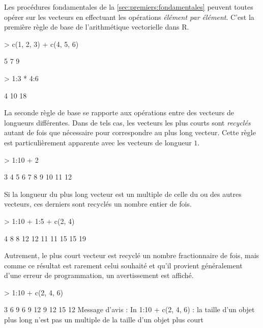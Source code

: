 Les procédures fondamentales de la \autoref{sec:premiers:fondamentales}
peuvent toutes opérer sur les vecteurs en effectuant les opérations
\emph{élément par élément}. C'est la première règle de base de
l'arithmétique vectorielle dans R.
\begin{Schunk}
\begin{Sinput}
> c(1, 2, 3) + c(4, 5, 6)
\end{Sinput}
\begin{Soutput}
[1] 5 7 9
\end{Soutput}
\begin{Sinput}
> 1:3 * 4:6
\end{Sinput}
\begin{Soutput}
[1]  4 10 18
\end{Soutput}
\end{Schunk}

La seconde règle de base se rapporte aux opérations entre des vecteurs
de longueurs différentes. Dans de tels cas, les vecteurs les plus
courts sont \emph{recyclés} autant de fois que nécessaire pour
correspondre au plus long vecteur. Cette règle est particulièrement
apparente avec les vecteurs de longueur $1$.
\begin{Schunk}
\begin{Sinput}
> 1:10 + 2
\end{Sinput}
\begin{Soutput}
 [1]  3  4  5  6  7  8  9 10 11 12
\end{Soutput}
\end{Schunk}

Si la longueur du plus long vecteur est un multiple de celle du ou des
autres vecteurs, ces derniers sont recyclés un nombre entier de fois.
\begin{Schunk}
\begin{Sinput}
> 1:10 + 1:5 + c(2, 4)
\end{Sinput}
\begin{Soutput}
 [1]  4  8  8 12 12 11 11 15 15 19
\end{Soutput}
\end{Schunk}

Autrement, le plus court vecteur est recyclé un nombre fractionnaire
de fois, mais comme ce résultat est rarement celui souhaité et qu'il
provient généralement d'une erreur de programmation, un avertissement
est affiché.
\begin{Schunk}
\begin{Sinput}
> 1:10 + c(2, 4, 6)
\end{Sinput}
\begin{Soutput}
 [1]  3  6  9  6  9 12  9 12 15 12
Message d'avis :
In 1:10 + c(2, 4, 6) :
la taille d'un objet plus long n'est pas un multiple de la
taille d'un objet plus court
\end{Soutput}
\end{Schunk}

